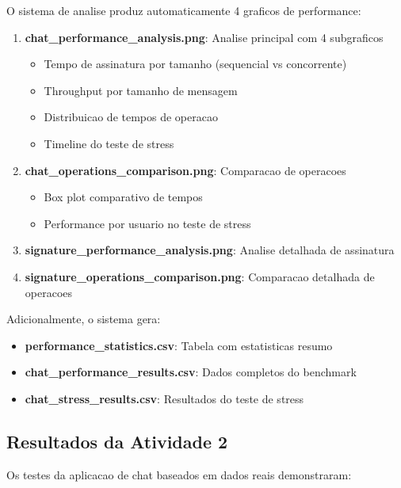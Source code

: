 \documentclass[12pt,a4paper,oneside]{article}
\begin{document}
O sistema de analise produz automaticamente 4 graficos de performance:

\begin{enumerate}
    \item \textbf{chat\_performance\_analysis.png}: Analise principal com 4 subgraficos
    \begin{itemize}
        \item Tempo de assinatura por tamanho (sequencial vs concorrente)
        \item Throughput por tamanho de mensagem
        \item Distribuicao de tempos de operacao
        \item Timeline do teste de stress
    \end{itemize}
    
    \item \textbf{chat\_operations\_comparison.png}: Comparacao de operacoes
    \begin{itemize}
        \item Box plot comparativo de tempos
        \item Performance por usuario no teste de stress
    \end{itemize}
    
    \item \textbf{signature\_performance\_analysis.png}: Analise detalhada de assinatura
    
    \item \textbf{signature\_operations\_comparison.png}: Comparacao detalhada de operacoes
\end{enumerate}

Adicionalmente, o sistema gera:
\begin{itemize}
    \item \textbf{performance\_statistics.csv}: Tabela com estatisticas resumo
    \item \textbf{chat\_performance\_results.csv}: Dados completos do benchmark
    \item \textbf{chat\_stress\_results.csv}: Resultados do teste de stress
\end{itemize}

\subsection{Resultados da Atividade 2}

Os testes da aplicacao de chat baseados em dados reais demonstraram:
\end{document}
